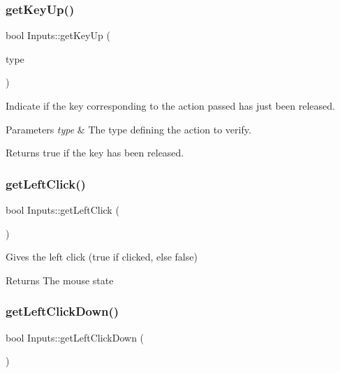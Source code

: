 \subsubsection{\texorpdfstring{get\+Key\+Up()}{getKeyUp()}}
{\footnotesize\ttfamily bool Inputs\+::get\+Key\+Up (\begin{DoxyParamCaption}\item[{Input\+Type\+::\+Enum}]{type }\end{DoxyParamCaption})\hspace{0.3cm}{\ttfamily [static]}}

Indicate if the key corresponding to the action passed has just been released.


\begin{DoxyParams}{Parameters}
{\em type} & The type defining the action to verify. \\
\hline
\end{DoxyParams}
\begin{DoxyReturn}{Returns}
true if the key has been released. 
\end{DoxyReturn}
\mbox{\label{class_inputs_afb5c85d715cac7d16434a71030dc4cfa}} 
\subsubsection{\texorpdfstring{get\+Left\+Click()}{getLeftClick()}}
{\footnotesize\ttfamily bool Inputs\+::get\+Left\+Click (\begin{DoxyParamCaption}{ }\end{DoxyParamCaption})\hspace{0.3cm}{\ttfamily [static]}}

Gives the left click (true if clicked, else false)

\begin{DoxyReturn}{Returns}
The mouse state 
\end{DoxyReturn}
\mbox{\label{class_inputs_aea7e7f3c2cc206616f4355cc6fba23e8}} 
\subsubsection{\texorpdfstring{get\+Left\+Click\+Down()}{getLeftClickDown()}}
{\footnotesize\ttfamily bool Inputs\+::get\+Left\+Click\+Down (\begin{DoxyParamCaption}{ }\end{DoxyParamCaption})\hspace{0.3cm}{\ttfamily [static]}}

